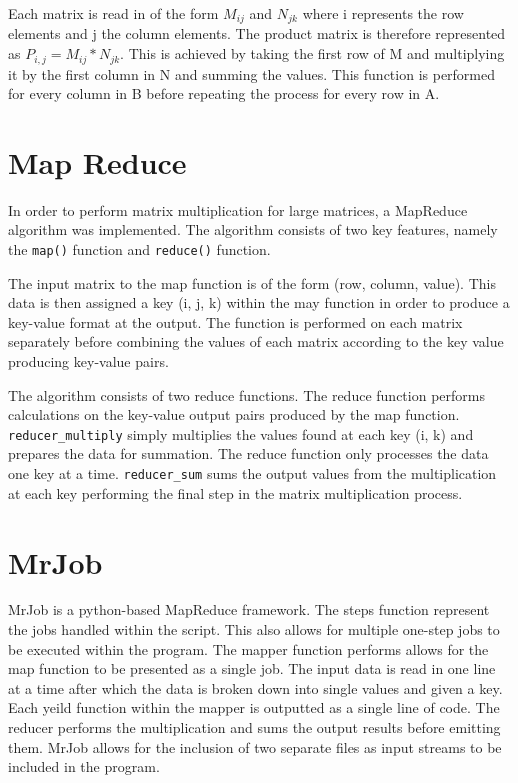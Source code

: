 \documentclass[10pt,twocolumn]{witseiepaper}
\begin{document}
Each matrix is read in of the form $M_{ij}$ and $N_{jk}$ where i represents the row elements and j the column elements. The product matrix is therefore represented as $P_{i,j} = M_{ij} * N_{jk}$. This is achieved by taking the first row of M and multiplying it by the first column in N and summing the values. This function is performed for every column in B before repeating the process for every row in A. 

\section{Map Reduce}

In order to perform matrix multiplication for large matrices, a MapReduce algorithm was implemented. The algorithm consists of two key features, namely the \verb|map()| function and \verb|reduce()| function. 

The input matrix to the map function is of the form (row, column, value). This data is then assigned a key (i, j, k) within the may function in order to produce a key-value format at the output. The function is performed on each matrix separately before combining the values of each matrix according to the key value producing key-value pairs.

The algorithm consists of two reduce functions. The reduce function performs calculations on the key-value output pairs produced by the map function. \verb|reducer_multiply| simply multiplies the values found at each key (i, k) and prepares the data for summation. The reduce function only processes the data one key at a time. \verb|reducer_sum| sums the output values from the multiplication at each key performing the final step in the matrix multiplication process.

\section{MrJob}

MrJob is a python-based MapReduce framework. The steps function represent the jobs handled within the script. This also allows for multiple one-step jobs to be executed within the program. The mapper function performs allows for the map function to be presented as a single job. The input data is read in one line at a time after which the data is broken down into single values and given a key. Each yeild function within the mapper is outputted as a single line of code. The reducer performs the multiplication and sums the output results before emitting them. MrJob allows for the inclusion of two separate files as input streams to be included in the program.
\end{document}
